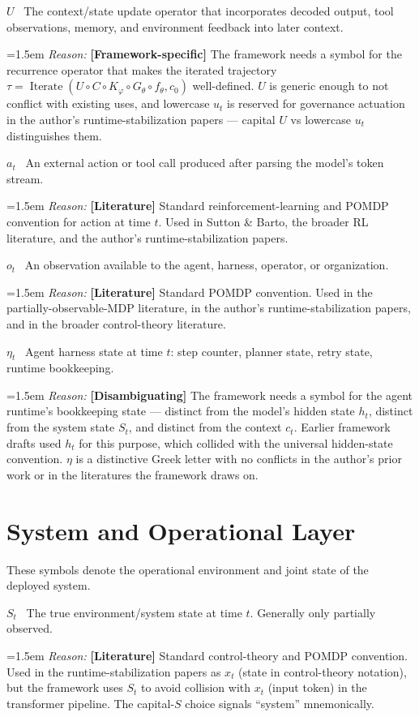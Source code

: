 \documentclass[11pt]{article}
\DeclareMathOperator{\Iterate}{Iterate}
\newcommand{\notation}[2]{%
  \par\smallskip
  \noindent\textbf{#1} \, #2\par
}
\newcommand{\reason}[2]{%
  \par\nopagebreak
  \begingroup
    \leftskip=1.5em
    \sloppy
    \noindent\textit{Reason:} \textbf{[#1]} #2\par
  \endgroup
  \par\smallskip
}
\begin{document}
\notation{$U$}{The context/state update operator that incorporates decoded output, tool observations, memory, and environment feedback into later context.}
\reason{Framework-specific}{The framework needs a symbol for the recurrence operator that makes the iterated trajectory $\tau = \Iterate(U \circ C \circ K_\varphi \circ G_\theta \circ f_\theta, c_0)$ well-defined. $U$ is generic enough to not conflict with existing uses, and lowercase $u_t$ is reserved for governance actuation in the author's runtime-stabilization papers --- capital $U$ vs lowercase $u_t$ distinguishes them.}

\notation{$a_t$}{An external action or tool call produced after parsing the model's token stream.}
\reason{Literature}{Standard reinforcement-learning and POMDP convention for action at time $t$. Used in Sutton \& Barto, the broader RL literature, and the author's runtime-stabilization papers.}

\notation{$o_t$}{An observation available to the agent, harness, operator, or organization.}
\reason{Literature}{Standard POMDP convention. Used in the partially-observable-MDP literature, in the author's runtime-stabilization papers, and in the broader control-theory literature.}

\notation{$\eta_t$}{Agent harness state at time $t$: step counter, planner state, retry state, runtime bookkeeping.}
\reason{Disambiguating}{The framework needs a symbol for the agent runtime's bookkeeping state --- distinct from the model's hidden state $h_t$, distinct from the system state $S_t$, and distinct from the context $c_t$. Earlier framework drafts used $h_t$ for this purpose, which collided with the universal hidden-state convention. $\eta$ is a distinctive Greek letter with no conflicts in the author's prior work or in the literatures the framework draws on.}

\section{System and Operational Layer}

These symbols denote the operational environment and joint state of the deployed system.

\notation{$S_t$}{The true environment/system state at time $t$. Generally only partially observed.}
\reason{Literature}{Standard control-theory and POMDP convention. Used in the runtime-stabilization papers as $x_t$ (state in control-theory notation), but the framework uses $S_t$ to avoid collision with $x_t$ (input token) in the transformer pipeline. The capital-$S$ choice signals ``system'' mnemonically.}
\end{document}
